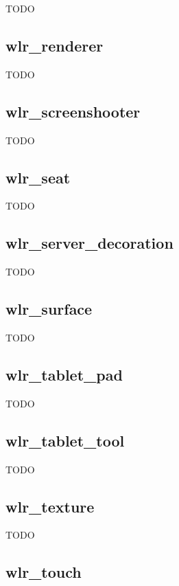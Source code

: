 \documentclass{article}
\begin{document}
TODO

\subsection{wlr_renderer}\label{wlr renderer}

TODO

\subsection{wlr_screenshooter}\label{wlr screenshooter}

TODO

\subsection{wlr_seat}\label{wlr seat}

TODO

\subsection{wlr_server_decoration}\label{wlr server decoration}

TODO

\subsection{wlr_surface}\label{wlr surface}

TODO

\subsection{wlr_tablet_pad}\label{wlr tablet pad}

TODO

\subsection{wlr_tablet_tool}\label{wlr tablet tool}

TODO

\subsection{wlr_texture}\label{wlr texture}

TODO

\subsection{wlr_touch}\label{wlr touch}
\end{document}

